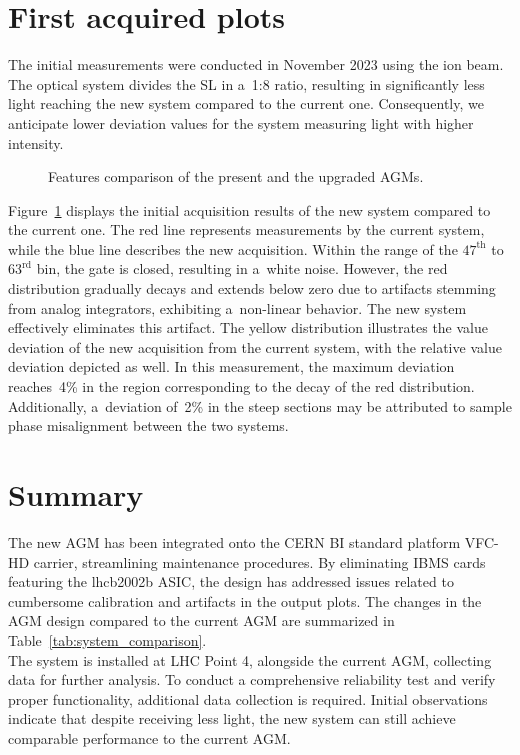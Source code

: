 \section{First acquired plots}
The initial measurements were conducted in November 2023 using the ion beam.
The optical system divides the SL in a~1:8 ratio, resulting in significantly
less light reaching the new system compared to the current one. Consequently,
we anticipate lower deviation values for the system measuring light with higher
intensity.
\begin{figure}[!htb]
    \begin{center}
        \scalebox{0.54}{}
        \caption{Features comparison of the present and the upgraded AGMs.}
        \label{fig:comparison_chart}
    \end{center}
\end{figure}
Figure~\ref{fig:comparison_chart} displays the initial acquisition results of the new system compared to the current one. The red line represents
measurements by the current system, while the blue line describes the new
acquisition. Within the range of the $47^{\text{th}}$ to $63^{\text{rd}}$ bin, the gate is closed,
resulting in a~white noise. However, the red distribution gradually decays and extends
below zero due to artifacts stemming from analog integrators,
exhibiting a~non-linear behavior. The new system effectively eliminates this
artifact. The yellow distribution illustrates the value deviation of the new
acquisition from the current system, with the relative value deviation depicted
as well. In this measurement, the maximum deviation reaches~4\% in the region
corresponding to the decay of the red distribution. Additionally, a~deviation of~2\% in
the steep sections may be attributed to sample phase misalignment between the two systems.

\section{Summary}
The new AGM has been integrated onto the CERN BI standard platform VFC-HD
carrier, streamlining maintenance procedures. By eliminating IBMS cards
featuring the lhcb2002b ASIC, the design has addressed issues related to
cumbersome calibration and artifacts in the output plots. The changes in the
AGM design compared to the current AGM are summarized in
Table~\ref{tab:system_comparison}.\\
The system is installed at LHC Point 4, alongside the current AGM, collecting
data for further analysis. To conduct a comprehensive reliability test and
verify proper functionality, additional data collection is required. Initial
observations indicate that despite receiving less light, the new system can
still achieve comparable performance to the current AGM.
 





